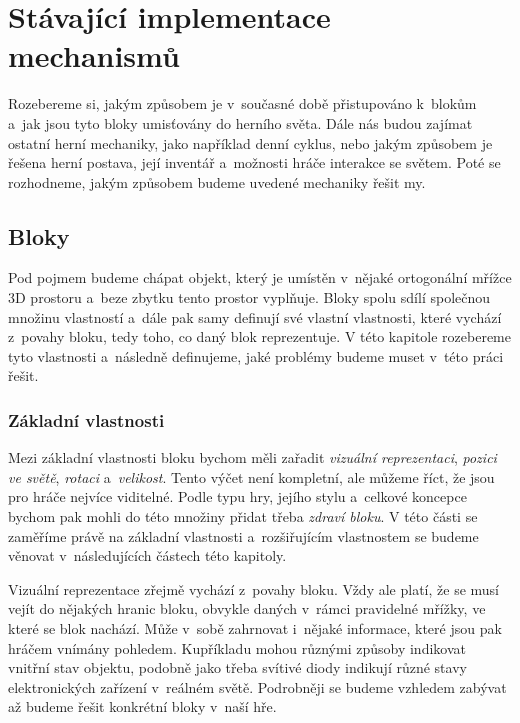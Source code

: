 

\section{Stávající implementace mechanismů}

Rozebereme si, jakým způsobem je v~současné době přistupováno k~blokům a~jak jsou tyto bloky umisťovány do herního světa. Dále nás budou zajímat ostatní herní mechaniky, jako například denní cyklus, nebo jakým způsobem je řešena herní postava, její inventář a~možnosti hráče interakce se světem. Poté se rozhodneme, jakým způsobem budeme uvedené mechaniky řešit my.

\subsection{Bloky}
\label{subsec:blocks}

Pod pojmem  budeme chápat objekt, který je umístěn v~nějaké ortogonální mřížce 3D prostoru a~beze zbytku tento prostor vyplňuje. Bloky spolu sdílí společnou množinu vlastností a~dále pak samy definují své vlastní vlastnosti, které vychází z~povahy bloku, tedy toho, co daný blok reprezentuje. V této kapitole rozebereme tyto vlastnosti a~následně definujeme, jaké problémy budeme muset v~této práci řešit.


\subsubsection{Základní vlastnosti}

Mezi základní vlastnosti bloku bychom měli zařadit \textit{vizuální reprezentaci}, \textit{pozici ve světě}, \textit{rotaci} a~\textit{velikost}. Tento výčet není kompletní, ale můžeme říct, že jsou pro hráče nejvíce viditelné. Podle typu hry, jejího stylu a~celkové koncepce bychom pak mohli do této množiny přidat třeba \textit{zdraví bloku}. V této části se zaměříme právě na základní vlastnosti a~rozšiřujícím vlastnostem se budeme věnovat v~následujících částech této kapitoly.

Vizuální reprezentace zřejmě vychází z~povahy bloku. Vždy ale platí, že se musí vejít do nějakých hranic bloku, obvykle daných v~rámci pravidelné mřížky, ve které se blok nachází. Může v~sobě zahrnovat i~nějaké informace, které jsou pak hráčem vnímány pohledem. Kupříkladu mohou různými způsoby indikovat vnitřní stav objektu, podobně jako třeba svítivé diody indikují různé stavy elektronických zařízení v~reálném světě. Podrobněji se budeme vzhledem zabývat až budeme řešit konkrétní bloky v~naší hře.

